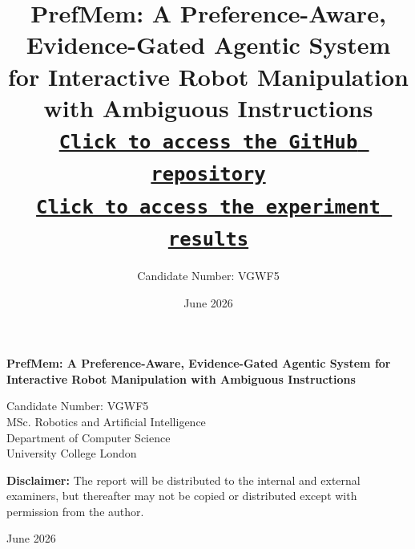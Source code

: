 \documentclass{article}
\title{
    PrefMem: A Preference-Aware, Evidence-Gated Agentic System for
    Interactive Robot Manipulation with Ambiguous Instructions
    \\[0.6em]
    \large
    \href{\githuburl}{\texttt{Click to access the GitHub repository}}
    \\[0.3em]
    \href{\resultsurl}{\texttt{Click to access the experiment results}}
}
\author{Candidate Number: VGWF5}
\date{June 2026}
\begin{document}

\begin{titlepage}

    \centering

    \vspace*{\fill}

    {\LARGE\bfseries
    PrefMem: A Preference-Aware, Evidence-Gated Agentic System for
    Interactive Robot Manipulation with Ambiguous Instructions
    \par}

    \vspace{2cm}

    {\large

    Candidate Number: VGWF5\\[0.3cm]

    MSc. Robotics and Artificial Intelligence\\
    Department of Computer Science\\
    University College London\\[0.8cm]



    \par}

    \vfill

    \begin{minipage}{0.85\textwidth}

        \small

        \textbf{Disclaimer:}
        The report will be distributed to the internal and external
        examiners, but thereafter may not be copied or distributed
        except with permission from the author.

    \end{minipage}

    \vspace{1.5cm}

    {\large June 2026\par}

    \vspace*{\fill}

\end{titlepage}
\end{document}
